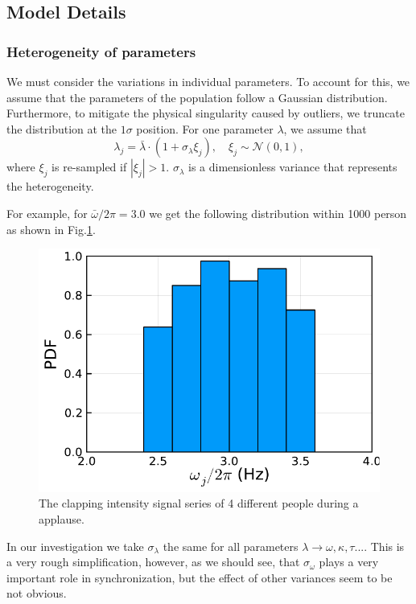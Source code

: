\documentclass[UTF8,a4paper,11pt]{ctexart}
\begin{document}
\subsection{Model Details}

\subsubsection{Heterogeneity of parameters}

We must consider the variations in individual parameters. To account for this, we assume that the parameters of the population follow a Gaussian distribution. Furthermore, to mitigate the physical singularity caused by outliers, we truncate the distribution at the $1σ$ position. For one parameter $λ$, we assume that
\begin{equation}
    λ_j = \bar{λ} ⋅(1+σ_λ ξ_j),\quad ξ_j \sim \mathcal{N}(0,1),
\end{equation}
where $ξ_j$ is re-sampled if $|ξ_j| >1$. $σ_λ$ is a dimensionless variance that represents the heterogeneity.

For example, for $\bar{ω}/2π=3.0$ we get the following distribution within 1000 person as shown in Fig.\ref{fig:omegadist}.

\begin{figure}[H]
    \centering
    \includegraphics[scale=0.6]{omegadist.pdf}
    \caption{The clapping intensity signal series of 4 different people during a applause.}
    \label{fig:omegadist}
\end{figure}

In our investigation we take $σ_λ$ the same for all parameters $λ→ω,κ,τ...$. This is a very rough simplification, however, as we should see, that $σ_ω$ plays a very important role in synchronization, but the effect of other variances seem to be not obvious.
\end{document}
